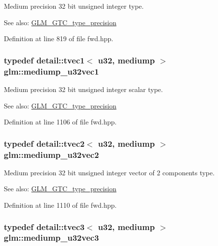 Medium precision 32 bit unsigned integer type. \begin{Desc}
\item[See also:]\hyperlink{group__gtc__type__precision}{GLM\_\-GTC\_\-type\_\-precision} \end{Desc}


Definition at line 819 of file fwd.hpp.\hypertarget{group__gtc__type__precision_g323fb0ed8f492d918b087226db2994f3}{
\subsubsection[mediump\_\-u32vec1]{\setlength{\rightskip}{0pt plus 5cm}typedef detail::tvec1$<$ u32, mediump $>$ {\bf glm::mediump\_\-u32vec1}}}
\label{group__gtc__type__precision_g323fb0ed8f492d918b087226db2994f3}


Medium precision 32 bit unsigned integer scalar type. \begin{Desc}
\item[See also:]\hyperlink{group__gtc__type__precision}{GLM\_\-GTC\_\-type\_\-precision} \end{Desc}


Definition at line 1106 of file fwd.hpp.\hypertarget{group__gtc__type__precision_g5d16ea7e110d8ba923ca347c16704f88}{
\subsubsection[mediump\_\-u32vec2]{\setlength{\rightskip}{0pt plus 5cm}typedef detail::tvec2$<$ u32, mediump $>$ {\bf glm::mediump\_\-u32vec2}}}
\label{group__gtc__type__precision_g5d16ea7e110d8ba923ca347c16704f88}


Medium precision 32 bit unsigned integer vector of 2 components type. \begin{Desc}
\item[See also:]\hyperlink{group__gtc__type__precision}{GLM\_\-GTC\_\-type\_\-precision} \end{Desc}


Definition at line 1110 of file fwd.hpp.\hypertarget{group__gtc__type__precision_g84a903ce8834b22f78d80a64eb0181bb}{
\subsubsection[mediump\_\-u32vec3]{\setlength{\rightskip}{0pt plus 5cm}typedef detail::tvec3$<$ u32, mediump $>$ {\bf glm::mediump\_\-u32vec3}}}
\label{group__gtc__type__precision_g84a903ce8834b22f78d80a64eb0181bb}


